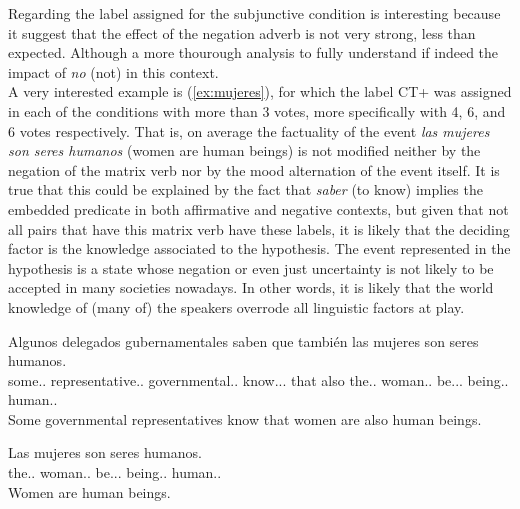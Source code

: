 Regarding the label assigned for the subjunctive condition is interesting because it suggest that the effect of the negation adverb is not very strong, less than expected. Although a more thourough analysis to fully understand if indeed the impact of \textit{no} (not) in this context.\\

A very interested example is (\ref{ex:mujeres}), for which the label CT+ was assigned in each of the conditions with more than 3 votes, more specifically with 4, 6, and 6 votes respectively. That is, on average the factuality of the event \textit{las mujeres son seres humanos} (women are human beings) is not modified neither by the negation of the matrix verb nor by the mood alternation of the event itself. It is true that this could be explained by the fact that \textit{saber} (to know) implies the embedded predicate in both affirmative and negative contexts, but given that not all pairs that have this matrix verb have these labels, it is likely that the deciding factor is the knowledge associated to the hypothesis. The event represented in the hypothesis is a state whose negation or even just uncertainty is not likely to be accepted in many societies nowadays. In other words, it is likely that the world knowledge of (many of) the speakers overrode all linguistic factors at play.\\

\begin{exe}
  \ex\label{ex:mujeres}
    \begin{xlist}
      \item{\gll Algunos delegados gubernamentales saben que también las mujeres son seres humanos.\\ some.\M.\Pl{} representative.\M.\Pl{} governmental.\M.\Pl{} know.\Prs.\Ind.\Tsg{} that also the.\F.\Pl{} woman.\F.\Pl{} be.\Prs.\Ind.\Tpl{} being.\M.\Pl{} human.\M.\Pl{} \\\glt Some governmental representatives know that women are also human beings.}
      \item{\gll Las mujeres son seres humanos.\\ the.\F.\Pl{} woman.\F.\Pl{} be.\Prs.\Ind.\Tpl{} being.\M.\Pl{} human.\M.\Pl{} \\\glt Women are human beings.} \label{ex:hypmujeres}
    \end{xlist}
\end{exe}

